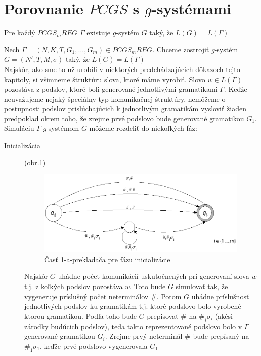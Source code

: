 \section{Porovnanie $PCGS$ s $g$-systémami}

\begin{veta}
  Pre každý $PCGS_mREG$ $\Gamma$ existuje $g$-systém $G$ taký, že
  $L(G)=L(\Gamma)$
\end{veta}

\begin{dokaz}
  Nech $\Gamma=(N,K,T,G_1,\dots ,G_m)\in PCGS_mREG$. Chceme
  zostrojiť $g$-systém $G=(N',T,M,\sigma)$ taký, že $L(G)=L(\Gamma)$
  \\ Najskôr, ako sme to už urobili v niektorých predchádzajúcich
  dôkazoch tejto kapitoly, si všimneme štruktúru slova, ktoré máme
  vyrobiť. Slovo $w\in L(\Gamma)$ pozostáva z podslov, ktoré boli
  generované jednotlivými gramatikami $\Gamma$. Keďže neuvažujeme
  nejaký špeciálny typ komunikačnej štruktúry, nemôžeme o
  postupnosti podslov prislúchajúcich k jednotlivým gramatikám
  vysloviť žiaden predpoklad okrem toho, že zrejme prvé podslovo
  bude generované gramatikou $G_1$.
  \\ Simuláciu $\Gamma$ $g$-systémom $G$ môžeme rozdeliť do
  niekoľkých fáz:
  \begin{description}
    \item[Inicializácia] (obr.\ref{pcgsgs1})

  \begin{figure}[ht]
    \centering
    \includegraphics{img/pcgsgs/pcgsgs1}
    \caption{Časť 1-a-prekladača pre fázu inicializácie}\label{pcgsgs1}
  \end{figure}

    Najskôr $G$ uhádne počet komunikácií uskutočnených pri
    generovaní slova $w$ t.j. z koľkých podslov pozostáva $w$. Toto
    bude $G$ simulovať tak, že vygeneruje príslušný počet neterminálov $\#$.
    Potom $G$ uhádne príslušnosť jednotlivých podslov ku gramatikám
    t.j. ktoré podslovo bolo vyrobené ktorou gramatikou. Podľa toho
    bude $G$ prepisovať $\#$ na $\#_i\sigma_i$ (akési zárodky budúcich podslov),
    teda takto reprezentované podslovo bolo v $\Gamma$ generované gramatikou
    $G_i$. Zrejme prvý neterminál $\#$ bude prepísaný na $\#_1\sigma_1$, keďže
    prvé podslovo vygenerovala $G_1$


\end{description}
\end{dokaz}
